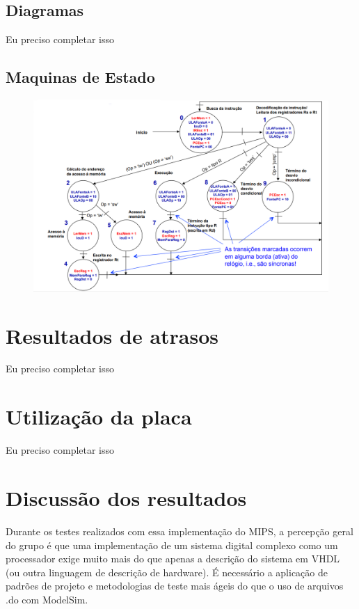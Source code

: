 \documentclass{article}
\begin{document}
    \subsection{Diagramas}

    Eu preciso completar isso

    \subsection{Maquinas de Estado}

    \begin{figure}[H]
        \centering %
        \includegraphics[scale=1.5]{maquina_estados.png} %
        \label{figura:maquina}
    \end{figure}

    \section{Resultados de atrasos}

    Eu preciso completar isso

    \section{Utilização da placa}

    Eu preciso completar isso

    \section{Discussão dos resultados}

    Durante os testes realizados com essa implementação do MIPS, a percepção geral do grupo é que 
    uma implementação de um sistema digital complexo como um processador exige muito mais do que apenas
    a descrição do sistema em VHDL (ou outra linguagem de descrição de hardware). É necessário a aplicação
    de padrões de projeto e metodologias de teste mais ágeis do que o uso de arquivos .do com ModelSim.
\end{document}

